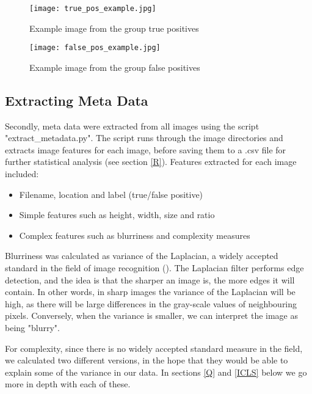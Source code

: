 \documentclass[12pt]{article}
\begin{document}
\begin{figure}
	\begin{center}
		\texttt{[image: true\_pos\_example.jpg]}
	\end{center}
	\caption{Example image from the group true positives}
	\label{fig:truepos}
\end{figure}

\begin{figure}
	\begin{center}
		\texttt{[image: false\_pos\_example.jpg]}
	\end{center}
	\caption{Example image from the group false positives}
	\label{fig:falsepos}
\end{figure}

\subsection{Extracting Meta Data}
Secondly, meta data were extracted from all images using the script "extract\_metadata.py". The script runs through the image directories and extracts image features for each image, before saving them to a .csv file for further statistical  analysis (see section \ref{R}).
Features extracted for each image included:

\begin{itemize}
	\item Filename, location and label (true/false positive)
	\item Simple features such as height, width, size and ratio
	\item Complex features such as blurriness and complexity measures
\end{itemize}

Blurriness was calculated as variance of the Laplacian, a widely accepted standard in the field of image recognition (\cite{bansalBlurImageDetection2016}). The Laplacian filter performs edge detection, and the idea is that the sharper an image is, the more edges it will contain. In other words, in sharp images the variance of the Laplacian will be high, as there will be large differences in the gray-scale values of neighbouring pixels. Conversely, when the variance is smaller, we can interpret the image as being "blurry".

For complexity, since there is no widely accepted standard measure in the field, we calculated two different versions, in the hope that they would be able to explain some of the variance in our data. In sections \ref{Q} and \ref{ICLS} below we go more in depth with each of these.
\end{document}
